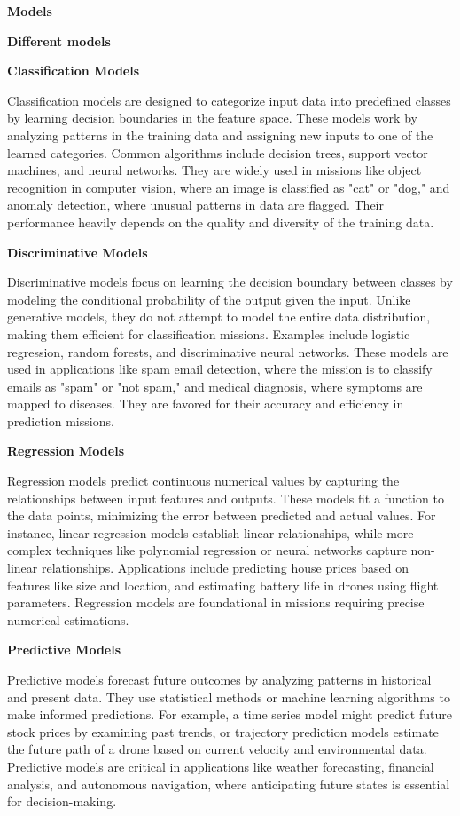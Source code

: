 \documentclass{book}
\providecommand{\ProjectDeepHeading}[2]{%
    \par\medskip\noindent\textbf{#2}\par\smallskip
}
\begin{document}
\ProjectDeepHeading{1}{Models}
\ProjectDeepHeading{2}{Different models}
\ProjectDeepHeading{3}{Classification Models}
Classification models are designed to categorize input data into predefined classes by learning decision boundaries in the feature space. These models work by analyzing patterns in the training data and assigning new inputs to one of the learned categories. Common algorithms include decision trees, support vector machines, and neural networks. They are widely used in missions like object recognition in computer vision, where an image is classified as "cat" or "dog," and anomaly detection, where unusual patterns in data are flagged. Their performance heavily depends on the quality and diversity of the training data.
    \ProjectDeepHeading{4}{Discriminative Models}
Discriminative models focus on learning the decision boundary between classes by modeling the conditional probability of the output given the input. Unlike generative models, they do not attempt to model the entire data distribution, making them efficient for classification missions. Examples include logistic regression, random forests, and discriminative neural networks. These models are used in applications like spam email detection, where the mission is to classify emails as "spam" or "not spam," and medical diagnosis, where symptoms are mapped to diseases. They are favored for their accuracy and efficiency in prediction missions.


\ProjectDeepHeading{3}{Regression Models}
Regression models predict continuous numerical values by capturing the relationships between input features and outputs. These models fit a function to the data points, minimizing the error between predicted and actual values. For instance, linear regression models establish linear relationships, while more complex techniques like polynomial regression or neural networks capture non-linear relationships. Applications include predicting house prices based on features like size and location, and estimating battery life in drones using flight parameters. Regression models are foundational in missions requiring precise numerical estimations.

\ProjectDeepHeading{3}{Predictive Models}
Predictive models forecast future outcomes by analyzing patterns in historical and present data. They use statistical methods or machine learning algorithms to make informed predictions. For example, a time series model might predict future stock prices by examining past trends, or trajectory prediction models estimate the future path of a drone based on current velocity and environmental data. Predictive models are critical in applications like weather forecasting, financial analysis, and autonomous navigation, where anticipating future states is essential for decision-making. 
\end{document}
